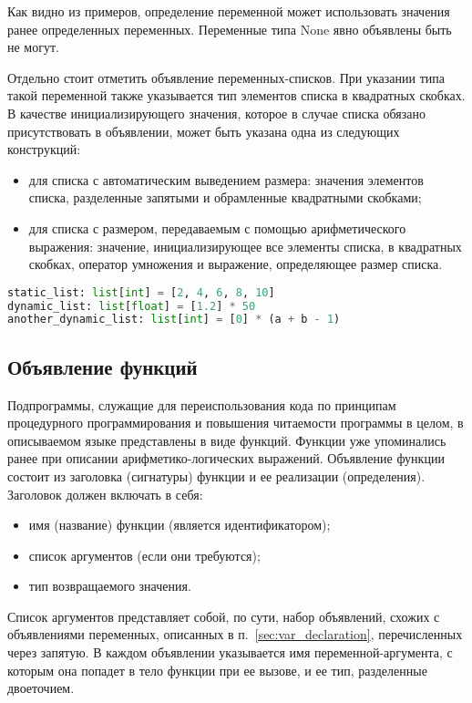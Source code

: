 Как видно из примеров, определение переменной может использовать значения ранее определенных переменных.
Переменные типа None явно объявлены быть не могут.

Отдельно стоит отметить объявление переменных-списков.
При указании типа такой переменной также указывается тип элементов списка в квадратных скобках.
В качестве инициализирующего значения, которое в случае списка обязано присутствовать в объявлении, может быть указана одна из следующих конструкций:

\begin{itemize}
    \item для списка с автоматическим выведением размера: значения элементов списка, разделенные запятыми и обрамленные квадратными скобками;
    \item для списка с размером, передаваемым с помощью арифметического выражения: значение, инициализирующее все элементы списка, в квадратных скобках, оператор умножения и выражение, определяющее размер списка.
\end{itemize}

\begin{lstlisting}[language=Python, caption=Примеры объявлений переменных типа list]
static_list: list[int] = [2, 4, 6, 8, 10]
dynamic_list: list[float] = [1.2] * 50
another_dynamic_list: list[int] = [0] * (a + b - 1)
\end{lstlisting}

\subsection{Объявление функций}

Подпрограммы, служащие для переиспользования кода по принципам процедурного программирования и повышения читаемости программы в целом, в описываемом языке представлены в виде функций.
Функции уже упоминались ранее при описании арифметико-логических выражений.
Объявление функции состоит из заголовка (сигнатуры) функции и ее реализации (определения).
Заголовок должен включать в себя:

\begin{itemize}
    \item имя (название) функции (является идентификатором);
    \item список аргументов (если они требуются);
    \item тип возвращаемого значения.
\end{itemize}

Список аргументов представляет собой, по сути, набор объявлений, схожих с объявлениями переменных, описанных в п.~\ref{sec:var_declaration}, перечисленных через запятую.
В каждом объявлении указывается имя переменной-аргумента, с которым она попадет в тело функции при ее вызове, и ее тип, разделенные двоеточием.


